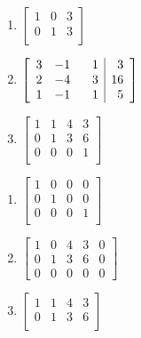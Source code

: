 \begin{multicols}{3} 
\begin{enumerate}


\item $\left[ \begin{array}{rr|r} 
1 & 0 & 3 \\ 
0 & 1 & 3  \\ 
\end{array} \right]$ \label{rreffirst}

\item $\left[ \begin{array}{rrr|r} 
3 & -1 & \hphantom{-}1 & 3 \\ 
2 & -4 & 3 & 16 \\ 
1 & -1 & 1 & 5  \\
\end{array} \right]$

\item $\left[ \begin{array}{rrr|r} 
1 & 1 & 4 & 3 \\ 
0 & 1 & 3 & 6 \\ 
0 & 0 & 0 & 1  \\
\end{array} \right]$

\setcounter{HW}{\value{enumi}}
\end{enumerate}
\end{multicols}

\begin{multicols}{3}
\begin{enumerate}
\setcounter{enumi}{\value{HW}}


\item $\left[ \begin{array}{rrr|r} 
1 & 0 & 0 & 0 \\ 
0 & 1 & 0 & 0 \\ 
0 & 0 & 0 & 1  \\
\end{array} \right]$

\item $\left[ \begin{array}{rrrr|r} 
1 & 0 & 4 & 3 & 0 \\ 
0 & 1 & 3 & 6 & 0 \\ 
0 & 0 & 0 & 0 & 0 
\end{array} \right]$

\item $\left[ \begin{array}{rrr|r} 
1 & 1 & 4 & 3 \\ 
0 & 1 & 3 & 6 \\
\end{array} \right]$ \label{rreflast}

\setcounter{HW}{\value{enumi}}
\end{enumerate}
\end{multicols}

